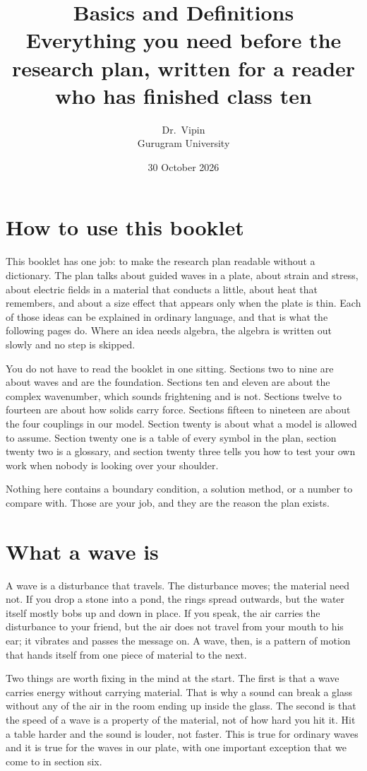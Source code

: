 \documentclass[11pt]{article}
\title{\vspace{-1.6cm}\Large Basics and Definitions\\[2pt]
\large Everything you need before the research plan, written for a reader who has finished class ten}
\author{Dr.\ Vipin \\ Gurugram University}
\date{30 October 2026}
\begin{document}
\maketitle
\vspace{-6mm}

\section{How to use this booklet}

This booklet has one job: to make the research plan readable without a dictionary. The plan talks about
guided waves in a plate, about strain and stress, about electric fields in a material that conducts a
little, about heat that remembers, and about a size effect that appears only when the plate is thin. Each of
those ideas can be explained in ordinary language, and that is what the following pages do. Where an idea
needs algebra, the algebra is written out slowly and no step is skipped.

You do not have to read the booklet in one sitting. Sections two to nine are about waves and are the
foundation. Sections ten and eleven are about the complex wavenumber, which sounds frightening and is not.
Sections twelve to fourteen are about how solids carry force. Sections fifteen to nineteen are about the
four couplings in our model. Section twenty is about what a model is allowed to assume. Section twenty one
is a table of every symbol in the plan, section twenty two is a glossary, and section twenty three tells you
how to test your own work when nobody is looking over your shoulder.

Nothing here contains a boundary condition, a solution method, or a number to compare with. Those are your
job, and they are the reason the plan exists.

\section{What a wave is}

A wave is a disturbance that travels. The disturbance moves; the material need not. If you drop a stone into
a pond, the rings spread outwards, but the water itself mostly bobs up and down in place. If you speak, the
air carries the disturbance to your friend, but the air does not travel from your mouth to his ear; it
vibrates and passes the message on. A wave, then, is a pattern of motion that hands itself from one piece of
material to the next.

Two things are worth fixing in the mind at the start. The first is that a wave carries energy without
carrying material. That is why a sound can break a glass without any of the air in the room ending up inside
the glass. The second is that the speed of a wave is a property of the material, not of how hard you hit it.
Hit a table harder and the sound is louder, not faster. This is true for ordinary waves and it is true for
the waves in our plate, with one important exception that we come to in section six.
\end{document}
